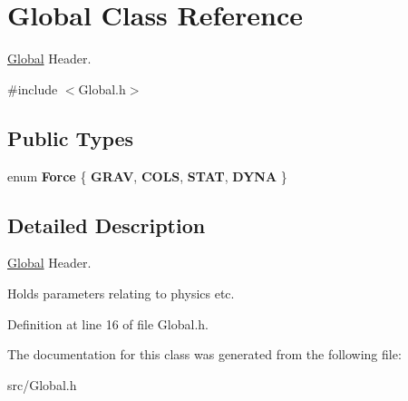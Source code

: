 \hypertarget{classGlobal}{\section{Global Class Reference}
\label{classGlobal}
}


\hyperlink{classGlobal}{Global} Header.  




{\ttfamily \#include $<$Global.\-h$>$}

\subsection*{Public Types}
\begin{DoxyCompactItemize}
\item 
enum {\bfseries Force} \{ {\bfseries G\-R\-A\-V}, 
{\bfseries C\-O\-L\-S}, 
{\bfseries S\-T\-A\-T}, 
{\bfseries D\-Y\-N\-A}
 \}
\end{DoxyCompactItemize}


\subsection{Detailed Description}
\hyperlink{classGlobal}{Global} Header. 

Holds parameters relating to physics etc. 

Definition at line 16 of file Global.\-h.



The documentation for this class was generated from the following file\-:\begin{DoxyCompactItemize}
\item 
src/Global.\-h\end{DoxyCompactItemize}
